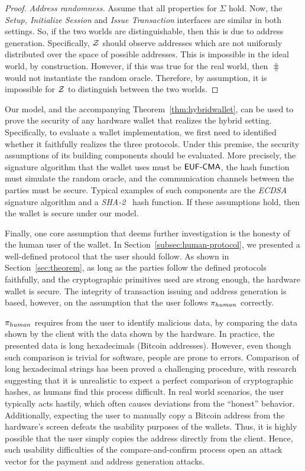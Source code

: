 \begin{proof}
     \emph{Address randomness.}
     Assume that all properties for $\Sigma$ hold. Now, the \emph{Setup,
     Initialize Session} and \emph{Issue Transaction} interfaces are similar in
     both settings. So, if the two worlds are distinguishable, then this is due
     to address generation. Specifically, $\mathcal{Z}$ should observe addresses which
     are not uniformly distributed over the space of possible addresses. This
     is impossible in the ideal world, by construction. However, if this was
     true for the real world, then $\hash$ would not instantiate the random
     oracle. Therefore, by assumption, it is impossible for $\mathcal{Z}$ to distinguish
     between the two worlds.
\end{proof}

Our model, and the accompanying Theorem~\ref{thm:hybridwallet}, can be used to
prove the security of any hardware wallet that realizes the hybrid setting.
Specifically, to evaluate a wallet implementation, we first need to identified
whether it faithfully realizes the three protocols. Under this premise, the
security assumptions of its building components should be evaluated. More
precisely, the signature algorithm that the wallet uses must be $\textsf{EUF-CMA}$, the
hash function must simulate the random oracle, and the communication channels
between the parties must be secure. Typical examples of such components are the
\emph{ECDSA}~\cite{johnson2001elliptic} signature algorithm and a
\emph{SHA-2}~\cite{penard2008secure} hash function. If these assumptions hold,
then the wallet is secure under our model.

Finally, one core assumption that deems further investigation is the honesty of
the human user of the wallet. In Section~\ref{subsec:human-protocol}, we
presented a well-defined protocol that the user should follow. As shown in
Section~\ref{sec:theorem}, as long as the parties follow the defined protocols
faithfully, and the cryptographic primitives used are strong enough, the
hardware wallet is secure. The integrity of transaction issuing and address
generation is based, however, on the assumption that the user follows $\pi_{human}$
correctly.

$\pi_{human}$ requires from the user to identify malicious data, by comparing the data
shown by the client with the data shown by the hardware. In practice, the
presented data is long hexadecimals (\ie Bitcoin addresses). However, even
though such comparison is trivial for software, people are prone to errors.
Comparison of long hexadecimal strings has been proved a challenging procedure,
with research~\cite{hsiao2009study,tan2017can,FC:UzuKarAso07} suggesting that
it is unrealistic to expect a perfect comparison of cryptographic hashes, as
humans find this process difficult. In real world scenarios, the user typically
acts hastily, which often causes deviations from the ``honest'' behavior.
Additionally, expecting the user to manually copy a Bitcoin address from the
hardware's screen defeats the usability purposes of the wallets. Thus, it is
highly possible that the user simply copies the address directly from the
client. Hence, such usability difficulties of the compare-and-confirm process
open an attack vector for the payment and address generation attacks.

